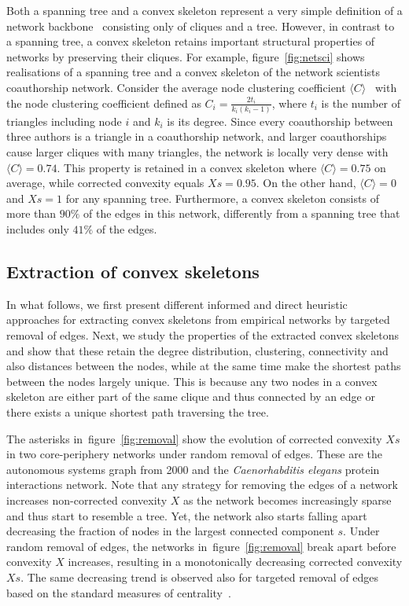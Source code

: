 \documentclass[]{rsif}
\newcommand{\avg}[1]{\langle#1\rangle}
\newcommand{\figref}[1]{figure~\ref{fig:#1}\xspace}
\newcommand{\celeg}{\emph{Caenorhabditis elegans}\xspace}
\begin{document}
Both a spanning tree and a convex skeleton represent a very simple definition of a network backbone~\cite{HLMSW16,CN17} consisting only of cliques and a tree. However, in contrast to a spanning tree, a convex skeleton retains important structural properties of networks by preserving their cliques. For example, \figref{netsci} shows realisations of a spanning tree and a convex skeleton of the network scientists coauthorship network. Consider the average node clustering coefficient $\avg{C}$~\cite{WS98} with the node clustering coefficient defined as $C_i=\frac{2t_i}{k_i(k_i-1)}$, where $t_i$ is the number of triangles including node $i$ and $k_i$ is its degree. Since every coauthorship between three authors is a triangle in a coauthorship network, and larger coauthorships cause larger cliques with many triangles, the network is locally very dense with $\avg{C}=0.74$. This property is retained in a convex skeleton where $\avg{C}=0.75$ on average, while corrected convexity equals $Xs=0.95$. On the other hand, $\avg{C}=0$ and $Xs=1$ for any spanning tree. Furthermore, a convex skeleton consists of more than $90\%$ of the edges in this network, differently from a spanning tree that includes only $41\%$ of the edges.

\subsection{Extraction of convex skeletons}

In what follows, we first present different informed and direct heuristic approaches for extracting convex skeletons from empirical networks by targeted removal of edges. Next, we study the properties of the extracted convex skeletons and show that these retain the degree distribution, clustering, connectivity and also distances between the nodes, while at the same time make the shortest paths between the nodes largely unique. This is because any two nodes in a convex skeleton are either part of the same clique and thus connected by an edge or there exists a unique shortest path traversing the tree.

The asterisks in~\figref{removal} show the evolution of corrected convexity $Xs$ in two core-periphery networks under random removal of edges. These are the autonomous systems graph from 2000 and the \celeg protein interactions network. Note that any strategy for removing the edges of a network increases non-corrected convexity $X$ as the network becomes increasingly sparse and thus start to resemble a tree. Yet, the network also starts falling apart decreasing the fraction of nodes in the largest connected component $s$. Under random removal of edges, the networks in~\figref{removal} break apart before convexity $X$ increases, resulting in a monotonically decreasing corrected convexity $Xs$. The same decreasing trend is observed also for targeted removal of edges based on the standard measures of centrality~\cite{Bav50,Fre77,Fre79}.
\end{document}
